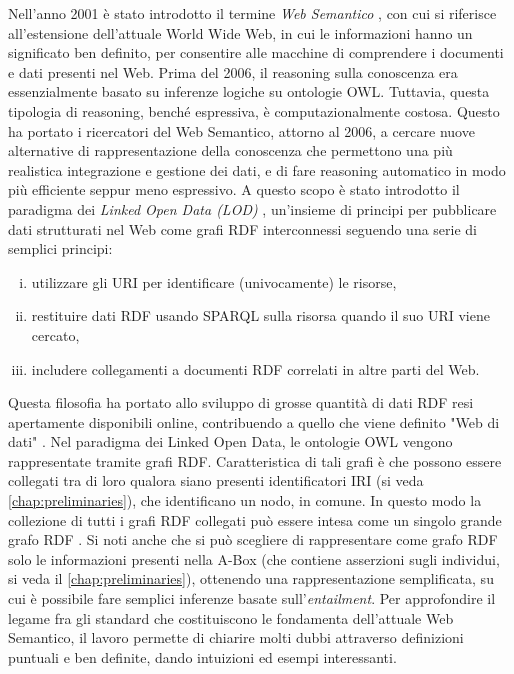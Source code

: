 Nell'anno 2001 è stato introdotto il termine \emph{Web Semantico} \cite{berners2001semantic}, con cui si riferisce all'estensione dell'attuale World Wide Web, in cui le informazioni hanno un significato ben definito, per consentire alle macchine di comprendere i documenti e dati presenti nel Web. Prima del 2006, il reasoning sulla conoscenza era essenzialmente basato su inferenze logiche su ontologie OWL. Tuttavia, questa tipologia di reasoning, benché espressiva, è computazionalmente costosa. Questo ha portato i ricercatori del Web Semantico, attorno al 2006, a cercare nuove alternative di rappresentazione della conoscenza che permettono una più realistica integrazione e gestione dei dati, e di fare reasoning automatico in modo più efficiente seppur meno espressivo. A questo scopo è stato introdotto il paradigma dei \textit{Linked Open Data (LOD)} \cite{hitzler2021review}, un'insieme di principi per pubblicare dati strutturati nel Web come grafi RDF interconnessi seguendo una serie di semplici principi: 
\begin{enumerate}[(i)]
	\item utilizzare gli URI per identificare (univocamente) le risorse,
	\item restituire dati RDF usando SPARQL sulla risorsa quando il suo URI viene cercato, 
	\item includere collegamenti a documenti RDF correlati in altre parti del Web.
\end{enumerate}
Questa filosofia ha portato allo sviluppo di grosse quantità di dati RDF resi apertamente disponibili online, contribuendo a quello che viene definito "Web di dati" \cite{polleres2013reasoningLOD}. Nel paradigma dei Linked Open Data, le ontologie OWL vengono rappresentate tramite grafi RDF. Caratteristica di tali grafi è che possono essere collegati tra di loro qualora siano presenti identificatori IRI (si veda \autoref{chap:preliminaries}), che identificano un nodo, in comune. In questo modo la collezione di tutti i grafi RDF collegati può essere intesa come un singolo grande grafo RDF \cite{polleres2013reasoningLOD}. Si noti anche che si può scegliere di rappresentare come grafo RDF solo le informazioni presenti nella A-Box (che contiene asserzioni sugli individui, si veda il \autoref{chap:preliminaries}), ottenendo una rappresentazione semplificata, su cui è possibile fare semplici inferenze basate sull'\emph{entailment}. Per approfondire il legame fra gli standard che costituiscono le fondamenta dell'attuale Web Semantico, il lavoro \cite{polleres2013reasoningLOD} permette di chiarire molti dubbi attraverso definizioni puntuali e ben definite, dando intuizioni ed esempi interessanti.

